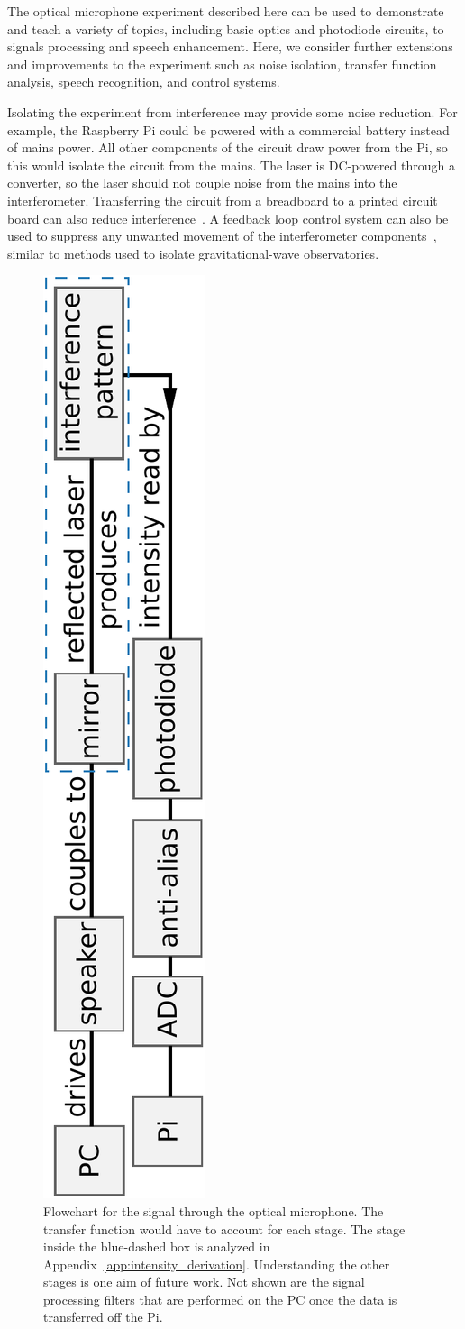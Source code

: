 \documentclass[paper-main.tex]{subfiles}
\begin{document}
The optical microphone experiment described here can be used to demonstrate and teach a variety of topics, including basic optics and photodiode circuits, to signals processing and speech enhancement. Here, we consider further extensions and improvements to the experiment such as noise isolation, transfer function analysis, speech recognition, and control systems.



Isolating the experiment from interference may provide some noise reduction. 
For example, the Raspberry Pi could be powered with a commercial battery instead of mains power. 
All other components of the circuit draw power from the Pi, so this would isolate the circuit from the mains. 
The laser is DC-powered through a converter, so the laser should not couple noise from the mains into the interferometer. 
Transferring the circuit from a breadboard to a printed circuit board can also reduce interference~\cite{elfekey2013design}.
A feedback loop control system can also be used to suppress any unwanted movement of the interferometer components~\citep{abbott2017exploring, Sekiguchi:2016bmv, verhoeven2009robust}, similar to methods used to isolate gravitational-wave observatories. 



\begin{figure}
	\includegraphics[height=.8\textwidth, angle=-90]{figures/pipeline.pdf}
	\caption{
Flowchart for the signal through the optical microphone. The transfer function would have to account for each stage. 
The stage inside the blue-dashed box is analyzed in Appendix~\ref{app:intensity_derivation}. Understanding the other stages is one aim of future work. Not shown are the signal processing filters that are performed on the PC once the data is transferred off the Pi.
}
	\label{fig:pipeline_highlighted}
\end{figure}
\end{document}
